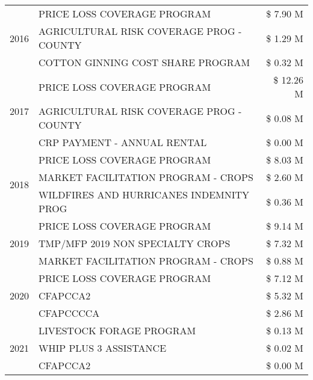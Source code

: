 \begin{tabular}{llr}
\cline{1-3}
\multirow[t]{3}{*}{2016} & PRICE LOSS COVERAGE PROGRAM & \$ 7.90 M \\
 & AGRICULTURAL RISK COVERAGE PROG - COUNTY & \$ 1.29 M \\
 & COTTON GINNING COST SHARE PROGRAM & \$ 0.32 M \\
\cline{1-3}
\multirow[t]{3}{*}{2017} & PRICE LOSS COVERAGE PROGRAM & \$ 12.26 M \\
 & AGRICULTURAL RISK COVERAGE PROG - COUNTY & \$ 0.08 M \\
 & CRP PAYMENT - ANNUAL RENTAL & \$ 0.00 M \\
\cline{1-3}
\multirow[t]{3}{*}{2018} & PRICE LOSS COVERAGE PROGRAM & \$ 8.03 M \\
 & MARKET FACILITATION PROGRAM - CROPS & \$ 2.60 M \\
 & WILDFIRES AND HURRICANES INDEMNITY PROG & \$ 0.36 M \\
\cline{1-3}
\multirow[t]{3}{*}{2019} & PRICE LOSS COVERAGE PROGRAM & \$ 9.14 M \\
 & TMP/MFP 2019 NON SPECIALTY CROPS & \$ 7.32 M \\
 & MARKET FACILITATION PROGRAM - CROPS & \$ 0.88 M \\
\cline{1-3}
\multirow[t]{3}{*}{2020} & PRICE LOSS COVERAGE PROGRAM & \$ 7.12 M \\
 & CFAPCCA2 & \$ 5.32 M \\
 & CFAPCCCCA & \$ 2.86 M \\
\cline{1-3}
\multirow[t]{3}{*}{2021} & LIVESTOCK FORAGE PROGRAM & \$ 0.13 M \\
 & WHIP PLUS 3 ASSISTANCE & \$ 0.02 M \\
 & CFAPCCA2 & \$ 0.00 M \\
\cline{1-3}
\bottomrule
\end{tabular}
